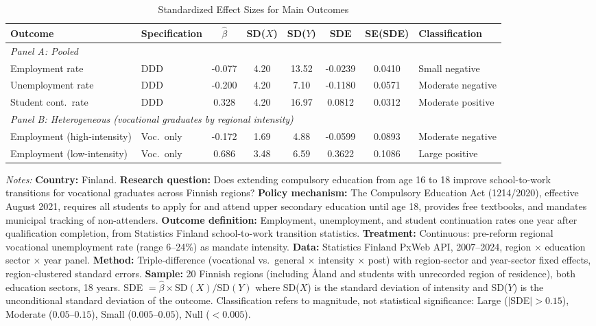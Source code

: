 \begin{table}[H]
\centering
\caption{Standardized Effect Sizes for Main Outcomes}
\label{tab:sde}
\begin{adjustbox}{max width=\textwidth}
\begin{tabular}{llcccccl}
\toprule
Outcome & Specification & $\hat{\beta}$ & SD($X$) & SD($Y$) & SDE & SE(SDE) & Classification \\
\midrule
\multicolumn{8}{l}{\textit{Panel A: Pooled}} \\
Employment rate & DDD & -0.077 & 4.20 & 13.52 & -0.0239 & 0.0410 & Small negative \\
Unemployment rate & DDD & -0.200 & 4.20 & 7.10 & -0.1180 & 0.0571 & Moderate negative \\
Student cont.~rate & DDD & 0.328 & 4.20 & 16.97 & 0.0812 & 0.0312 & Moderate positive \\
\midrule
\multicolumn{8}{l}{\textit{Panel B: Heterogeneous (vocational graduates by regional intensity)}} \\
Employment (high-intensity) & Voc.~only & -0.172 & 1.69 & 4.88 & -0.0599 & 0.0893 & Moderate negative \\
Employment (low-intensity) & Voc.~only & 0.686 & 3.48 & 6.59 & 0.3622 & 0.1086 & Large positive \\
\bottomrule
\end{tabular}
\end{adjustbox}
\par\vspace{0.3em}
{\scriptsize \textit{Notes:} \textbf{Country:} Finland. \textbf{Research question:} Does extending compulsory education from age 16 to 18 improve school-to-work transitions for vocational graduates across Finnish regions? \textbf{Policy mechanism:} The Compulsory Education Act (1214/2020), effective August 2021, requires all students to apply for and attend upper secondary education until age 18, provides free textbooks, and mandates municipal tracking of non-attenders. \textbf{Outcome definition:} Employment, unemployment, and student continuation rates one year after qualification completion, from Statistics Finland school-to-work transition statistics. \textbf{Treatment:} Continuous: pre-reform regional vocational unemployment rate (range 6--24\%) as mandate intensity. \textbf{Data:} Statistics Finland PxWeb API, 2007--2024, region $\times$ education sector $\times$ year panel. \textbf{Method:} Triple-difference (vocational vs.\ general $\times$ intensity $\times$ post) with region-sector and year-sector fixed effects, region-clustered standard errors. \textbf{Sample:} 20 Finnish regions (including \AA{}land and students with unrecorded region of residence), both education sectors, 18 years. SDE $= \hat{\beta} \times \text{SD}(X) / \text{SD}(Y)$ where SD($X$) is the standard deviation of intensity and SD($Y$) is the unconditional standard deviation of the outcome. Classification refers to magnitude, not statistical significance: Large ($|$SDE$| > 0.15$), Moderate ($0.05$--$0.15$), Small ($0.005$--$0.05$), Null ($< 0.005$).}
\end{table}

